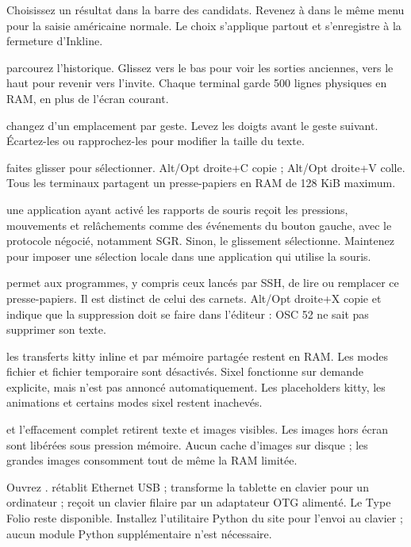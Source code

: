 Choisissez un résultat dans la barre des candidats. Revenez à
 dans le même menu pour la saisie américaine normale.
Le choix s'applique partout et s'enregistre à la fermeture d'Inkline.

 parcourez l'historique. Glissez vers le bas
pour voir les sorties anciennes, vers le haut pour revenir vers l'invite.
Chaque terminal garde 500 lignes physiques en RAM, en plus de l'écran courant.

 changez d'un emplacement par geste.
Levez les doigts avant le geste suivant. Écartez-les ou rapprochez-les pour
modifier la taille du texte.

 faites glisser pour sélectionner. Alt/Opt droite+C copie ;
Alt/Opt droite+V colle. Tous les terminaux partagent un presse-papiers en RAM
de 128 KiB maximum.

 une application ayant activé les rapports de souris reçoit
les pressions, mouvements et relâchements comme des événements du bouton gauche,
avec le protocole négocié, notamment SGR. Sinon, le glissement sélectionne.
Maintenez  pour imposer une sélection locale dans une application
qui utilise la souris.

 permet aux programmes, y compris ceux lancés par SSH, de lire ou
remplacer ce presse-papiers. Il est distinct de celui des carnets.
Alt/Opt droite+X copie et indique que la suppression doit se faire dans l'éditeur :
OSC 52 ne sait pas supprimer son texte.

 les transferts kitty inline et par mémoire partagée restent en
RAM. Les modes fichier et fichier temporaire sont désactivés. Sixel fonctionne
sur demande explicite, mais n'est pas annoncé automatiquement. Les placeholders
kitty, les animations et certains modes sixel restent inachevés.

 et l'effacement complet retirent texte et images visibles.
Les images hors écran sont libérées sous pression mémoire. Aucun cache d'images
sur disque ; les grandes images consomment tout de même la RAM limitée.

Ouvrez .  rétablit Ethernet USB ;
 transforme la tablette en clavier pour un ordinateur ;
 reçoit un clavier filaire par un adaptateur OTG alimenté.
Le Type Folio reste disponible. Installez l'utilitaire Python du site pour
l'envoi au clavier ; aucun module Python supplémentaire n'est nécessaire.

